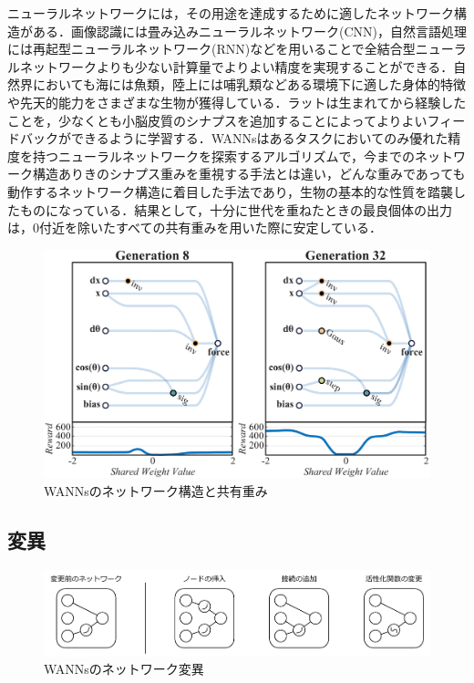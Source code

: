 ニューラルネットワークには，その用途を達成するために適したネットワーク構造がある．画像認識には畳み込みニューラルネットワーク(CNN)，自然言語処理には再起型ニューラルネットワーク(RNN)などを用いることで全結合型ニューラルネットワークよりも少ない計算量でよりよい精度を実現することができる\cite{深層学習}．自然界においても海には魚類，陸上には哺乳類などある環境下に適した身体的特徴や先天的能力をさまざまな生物が獲得している\cite{先天的能力}．ラットは生まれてから経験したことを，少なくとも小脳皮質のシナプスを追加することによってよりよいフィードバックができるように学習する\cite{シナプス学習}．WANNsはあるタスクにおいてのみ優れた精度を持つニューラルネットワークを探索するアルゴリズムで，今までのネットワーク構造ありきのシナプス重みを重視する手法とは違い，どんな重みであっても動作するネットワーク構造に着目した手法であり，生物の基本的な性質を踏襲したものになっている．結果として，十分に世代を重ねたときの最良個体の出力は，0付近を除いたすべての共有重みを用いた際に安定している．
\begin{figure}[h]
    \begin{center}
        \includegraphics[width=120mm]{img/wannweight.png}
        \caption{WANNsのネットワーク構造と共有重み}
    \end{center}
\end{figure}


\subsection{変異}

\begin{figure}[h]
    \begin{center}
        \includegraphics[scale=0.8]{img/vary.pdf}
        \caption{WANNsのネットワーク変異}
    \end{center}
\end{figure}

